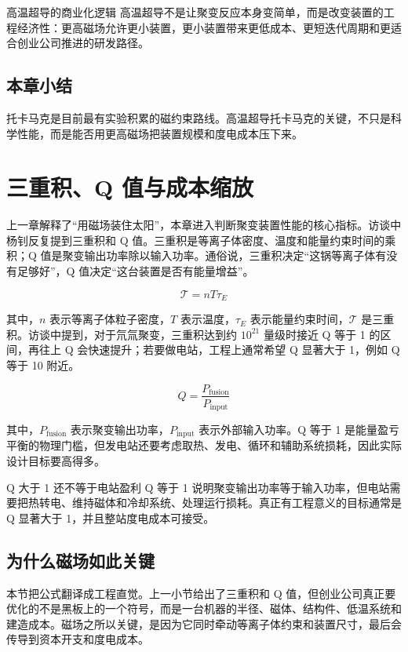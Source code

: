 \documentclass[a4paper]{article}
\begin{document}
\begin{importantbox}{高温超导的商业化逻辑}
高温超导不是让聚变反应本身变简单，而是改变装置的工程经济性：更高磁场允许更小装置，更小装置带来更低成本、更短迭代周期和更适合创业公司推进的研发路径。
\end{importantbox}

\subsection{本章小结}

托卡马克是目前最有实验积累的磁约束路线。高温超导托卡马克的关键，不只是科学性能，而是能否用更高磁场把装置规模和度电成本压下来。

\section{三重积、Q 值与成本缩放}

上一章解释了“用磁场装住太阳”，本章进入判断聚变装置性能的核心指标。访谈中杨钊反复提到三重积和 Q 值。三重积是等离子体密度、温度和能量约束时间的乘积；Q 值是聚变输出功率除以输入功率。通俗说，三重积决定“这锅等离子体有没有足够好”，Q 值决定“这台装置是否有能量增益”。

\[
\mathcal{T}=n T \tau_E
\]

其中，$n$ 表示等离子体粒子密度，$T$ 表示温度，$\tau_E$ 表示能量约束时间，$\mathcal{T}$ 是三重积。访谈中提到，对于氘氚聚变，三重积达到约 $10^{21}$ 量级时接近 Q 等于 1 的区间，再往上 Q 会快速提升；若要做电站，工程上通常希望 Q 显著大于 1，例如 Q 等于 10 附近。

\[
Q=\frac{P_{\mathrm{fusion}}}{P_{\mathrm{input}}}
\]

其中，$P_{\mathrm{fusion}}$ 表示聚变输出功率，$P_{\mathrm{input}}$ 表示外部输入功率。Q 等于 1 是能量盈亏平衡的物理门槛，但发电站还要考虑取热、发电、循环和辅助系统损耗，因此实际设计目标要高得多。

\begin{importantbox}{Q 大于 1 还不等于电站盈利}
Q 等于 1 说明聚变输出功率等于输入功率，但电站需要把热转电、维持磁体和冷却系统、处理运行损耗。真正有工程意义的目标通常是 Q 显著大于 1，并且整站度电成本可接受。
\end{importantbox}

\subsection{为什么磁场如此关键}

本节把公式翻译成工程直觉。上一小节给出了三重积和 Q 值，但创业公司真正要优化的不是黑板上的一个符号，而是一台机器的半径、磁体、结构件、低温系统和建造成本。磁场之所以关键，是因为它同时牵动等离子体约束和装置尺寸，最后会传导到资本开支和度电成本。
\end{document}

